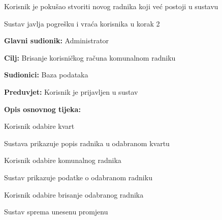 \begin{packed_item}
\begin{packed_item}
\begin{packed_enum}
								\item 
								
							\end{packed_enum}
							
							\item[5. a] Korisnik je pokušao stvoriti novog radnika koji već postoji u sustavu
							
								\item[] \begin{packed_enum}
								
								\item Sustav javlja pogrešku i vraća korisnika u korak 2
								
							\end{packed_enum}

							
						\end{packed_item}
					\end{packed_item}
				
				\noindent {}
					\begin{packed_item}
	
						\item \textbf{Glavni sudionik: }Administrator
						\item  \textbf{Cilj:} Brisanje korisničkog računa komunalnom radniku
						\item  \textbf{Sudionici:} Baza podataka
						\item  \textbf{Preduvjet:} Korisnik je prijavljen u sustav
						\item  \textbf{Opis osnovnog tijeka:}
						
						\item[] \begin{packed_enum}
	
							\item Korisnik odabire kvart
							\item Sustava prikazuje popis radnika u odabranom kvartu
							\item Korisnik odabire komunalnog radnika
							\item Sustav prikazuje podatke o odabranom radniku
							\item Korisnik odabire brisanje odabranog radnika
							\item Sustav sprema unesenu promjenu
						\end{packed_enum}
						
											\end{packed_item}
				
